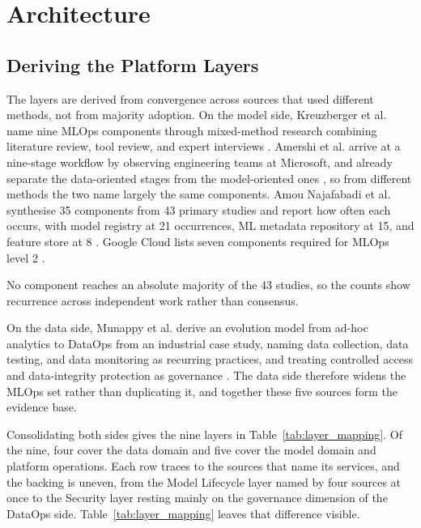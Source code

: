 
\section{Architecture}
\label{sec:architecture}



\subsection{Deriving the Platform Layers}
\label{subsec:layers}

The layers are derived from convergence across sources that used different methods, not from majority adoption. On the model side, Kreuzberger et al. name nine MLOps components through mixed-method research combining literature review, tool review, and expert interviews \cite{kreuzberger2023mlops}. Amershi et al. arrive at a nine-stage workflow by observing engineering teams at Microsoft, and already separate the data-oriented stages from the model-oriented ones \cite{amershi2019software}, so from different methods the two name largely the same components. Amou Najafabadi et al. synthesise 35 components from 43 primary studies and report how often each occurs, with model registry at 21 occurrences, ML metadata repository at 15, and feature store at 8 \cite{najafabadi2024analysis}. Google Cloud lists seven components required for MLOps level 2 \cite{googlecloud2024mlops}.

No component reaches an absolute majority of the 43 studies, so the counts show recurrence across independent work rather than consensus.

On the data side, Munappy et al. derive an evolution model from ad-hoc analytics to DataOps from an industrial case study, naming data collection, data testing, and data monitoring as recurring practices, and treating controlled access and data-integrity protection as governance \cite{munappy2020adhoc}. The data side therefore widens the MLOps set rather than duplicating it, and together these five sources form the evidence base.

Consolidating both sides gives the nine layers in Table~\ref{tab:layer_mapping}. Of the nine, four cover the data domain and five cover the model domain and platform operations. Each row traces to the sources that name its services, and the backing is uneven, from the Model Lifecycle layer named by four sources at once to the Security layer resting mainly on the governance dimension of the DataOps side. Table~\ref{tab:layer_mapping} leaves that difference visible.

